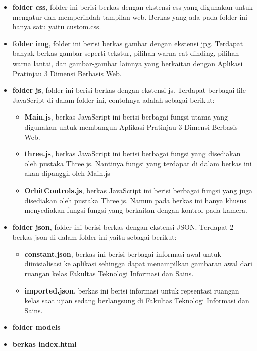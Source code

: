 \begin{itemize}
	\item {\bf folder css}, folder ini berisi berkas dengan ekstensi css yang digunakan untuk mengatur dan memperindah tampilan web. Berkas yang ada pada folder ini hanya satu yaitu custom.css.
	\item {\bf folder img}, folder ini berisi berkas gambar dengan ekstensi jpg. Terdapat banyak berkas gambar seperti tekstur, pilihan warna cat dinding, pilihan warna lantai, dan gambar-gambar lainnya yang berkaitan dengan Aplikasi Pratinjau 3 Dimensi Berbasis Web.
	\item {\bf folder js}, folder ini berisi berkas dengan ekstensi js. Terdapat berbagai file JavaScript di dalam folder ini, contohnya adalah sebagai berikut:
		\begin{itemize}
			\item {\bf Main.js}, berkas JavaScript ini berisi berbagai fungsi utama yang digunakan untuk membangun Aplikasi Pratinjau 3 Dimensi Berbasis Web.
			\item {\bf three.js}, berkas JavaScript ini berisi berbagai fungsi yang disediakan oleh pustaka Three.js. Nantinya fungsi yang terdapat di dalam berkas ini akan dipanggil oleh Main.js
			\item {\bf OrbitControls.js}, berkas JavaScript ini berisi berbagai fungsi yang juga disediakan oleh pustaka Three.js. Namun pada berkas ini hanya khusus menyediakan fungsi-fungsi yang berkaitan dengan kontrol pada kamera.
		\end{itemize}
	\item {\bf folder json}, folder ini berisi berkas dengan ekstensi JSON. Terdapat 2 berkas json di dalam folder ini yaitu sebagai berikut:
		\begin{itemize}
			\item {\bf constant.json}, berkas ini berisi berbagai informasi awal untuk diinisialisasi ke aplikasi sehingga dapat menampilkan gambaran awal dari ruangan kelas Fakultas Teknologi Informasi dan Sains.
			\item {\bf imported.json}, berkas ini berisi informasi untuk repsentasi ruangan kelas saat ujian sedang berlangsung di Fakultas Teknologi Informasi dan Sains.
		\end{itemize}
	\item {\bf folder models}
	\item {\bf berkas index.html}
\end{itemize}












